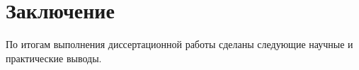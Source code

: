 \chapter*{Заключение}                       %


По итогам выполнения диссертационной работы сделаны следующие научные и практические выводы.






